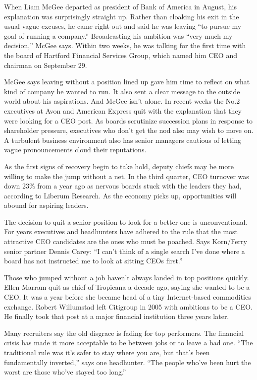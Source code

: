 When Liam McGee departed as president of Bank of America in August, his explanation was surprisingly straight up. Rather than cloaking his exit in the usual vague excuses, he came right out and said he was leaving ``to pursue my goal of running a company.'' Broadcasting his ambition was ``very much my decision,'' McGee says. Within two weeks, he was talking for the first time with the board of Hartford Financial Services Group, which named him CEO and chairman on September 29.


McGee says leaving without a position lined up gave him time to reflect on what kind of company he wanted to run. It also sent a clear message to the outside world about his aspirations. And McGee isn't alone. In recent weeks the No.2 executives at Avon and American Express quit with the explanation that they were looking for a CEO post. As boards scrutinize succession plans in response to shareholder pressure, executives who don't get the nod also may wish to move on. A turbulent business environment also has senior managers cautious of letting vague pronouncements cloud their reputations.


As the first signs of recovery begin to take hold, deputy chiefs may be more willing to make the jump without a net. In the third quarter, CEO turnover was down 23\% from a year ago as nervous boards stuck with the leaders they had, according to Liberum Research. As the economy picks up, opportunities will abound for aspiring leaders.


The decision to quit a senior position to look for a better one is unconventional. For years executives and headhunters have adhered to the rule that the most attractive CEO candidates are the ones who must be poached. Says Korn/Ferry senior partner Dennis Carey: ``I can't think of a single search I've done where a board has not instructed me to look at sitting CEOs first.''


Those who jumped without a job haven't always landed in top positions quickly. Ellen Marram quit as chief of Tropicana a decade ago, saying she wanted to be a CEO. It was a year before she became head of a tiny Internet-based commodities exchange. Robert Willumstad left Citigroup in 2005 with ambitions to be a CEO. He finally took that post at a major financial institution three years later.


Many recruiters say the old disgrace is fading for top performers. The financial crisis has made it more acceptable to be between jobs or to leave a bad one. ``The traditional rule was it's safer to stay where you are, but that's been fundamentally inverted,'' says one headhunter. ``The people who've been hurt the worst are those who've stayed too long.''